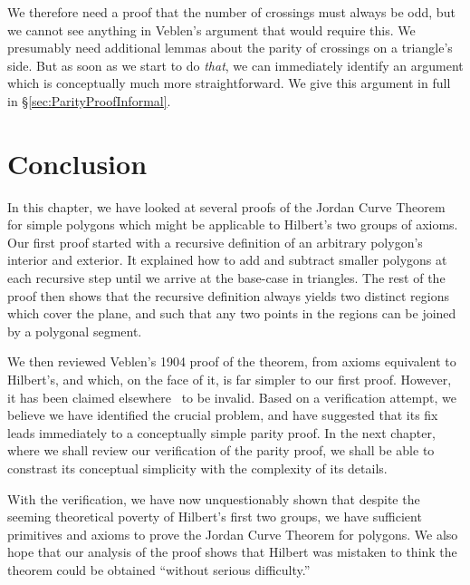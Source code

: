 We therefore need a proof that the number of crossings must always be odd, but we cannot see anything in Veblen's argument that would require this. We presumably need additional lemmas about the parity of crossings on a triangle's side. But as soon as we start to do \emph{that}, we can immediately identify an argument which is conceptually much more straightforward. We give this argument in full in \S\ref{sec:ParityProofInformal}.

\section{Conclusion}
In this chapter, we have looked at several proofs of the Jordan Curve Theorem for simple polygons which might be applicable to Hilbert's two groups of axioms. Our first proof started with a recursive definition of an arbitrary polygon's interior and exterior. It explained how to add and subtract smaller polygons at each recursive step until we arrive at the base-case in triangles. The rest of the proof then shows that the recursive definition always yields two distinct regions which cover the plane, and such that any two points in the regions can be joined by a polygonal segment.

We then reviewed Veblen's 1904 proof of the theorem, from axioms equivalent to Hilbert's, and which, on the face of it, is far simpler to our first proof. However, it has been claimed elsewhere~\cite{GuggenheimerJordanCurve,HahnInconclusiveIndirect} to be invalid. Based on a verification attempt, we believe we have identified the crucial problem, and have suggested that its fix leads immediately to a conceptually simple parity proof. In the next chapter, where we shall review our verification of the parity proof, we shall be able to constrast its conceptual simplicity with the complexity of its details. 

With the verification, we have now unquestionably shown that despite the seeming theoretical poverty of Hilbert's first two groups, we have sufficient primitives and axioms to prove the Jordan Curve Theorem for polygons. We also hope that our analysis of the proof shows that Hilbert was mistaken to think the theorem could be obtained ``without serious difficulty.''

